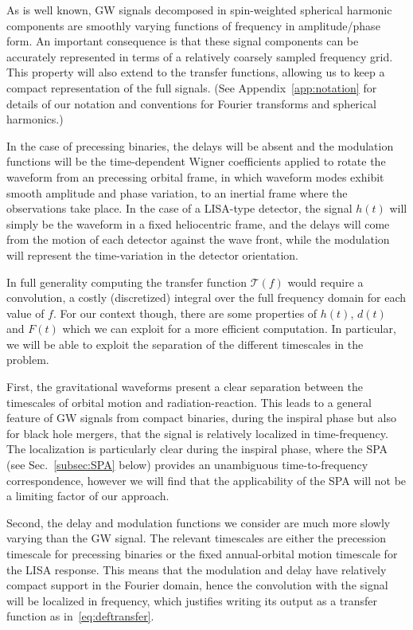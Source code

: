 \documentclass[aps,showpacs,twocolumn,
prd,superscriptaddress,nofootinbib]{revtex4-1}
\newcommand\calT{{\mathcal{T}}}
\newcommand{\jgb}[1]{{\color{DarkGreen} #1}}
\begin{document}
As is well known, GW signals decomposed in spin-weighted spherical harmonic components are smoothly varying functions of frequency in amplitude/phase form\cite{smoothAmpPhaseRefs}. An important consequence is that these signal components can be accurately represented in terms of a relatively coarsely sampled frequency grid. This property will also extend to the transfer functions, allowing us to keep a compact representation of the full signals. (See Appendix~\ref{app:notation} for details of our notation and conventions for Fourier transforms and spherical harmonics.)

In the case of precessing binaries, the delays will be absent and the modulation functions will be the time-dependent Wigner coefficients applied to rotate the waveform from an \jgb{precessing orbital frame, in which waveform modes exhibit smooth amplitude and phase variation}, to an inertial frame where the observations take place. In the case of a LISA-type detector, the signal $h(t)$ will simply be the waveform in a fixed heliocentric frame, and the delays will come from the motion of each detector against the wave front, while the modulation will represent the time-variation in the detector orientation.

In full generality computing the transfer function $\calT(f)$ would require a convolution, a costly (discretized) integral over the full frequency domain for each value of $f$. For our context though, there are some properties of $h(t)$, $d(t)$ and $F(t)$ which we can exploit for a more efficient computation. In particular, we will be able to exploit the separation of the different timescales in the problem.

First, the gravitational waveforms present a clear separation between the timescales of orbital motion and radiation-reaction. This leads to a general feature of GW signals from compact binaries, during the inspiral phase but also for black hole mergers, that the signal is relatively localized in time-frequency. The localization is particularly clear during the inspiral phase, where the SPA (see Sec.~\ref{subsec:SPA} below) provides an unambiguous time-to-frequency correspondence, however we will find that the applicability of the SPA will not be a limiting factor of our approach.

Second, the delay and modulation functions we consider are much more slowly varying than the GW signal. The relevant timescales are either the precession timescale for precessing binaries or the fixed annual-orbital motion timescale for the LISA response. This means that the modulation and delay have relatively compact support in the Fourier domain, hence the convolution with the signal will be localized in frequency, which justifies writing its output as a transfer function as in~\eqref{eq:deftransfer}.
\end{document}
